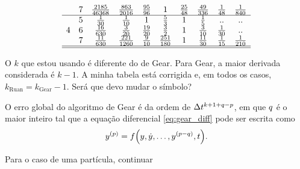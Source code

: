 \begin{table}[h]
\begin{equation*}
\begin{array}{cccccccccc}
		& 7 & \frac{2185}{46368} & \frac{863}{2016} & \frac{95}{96} & 1 & \frac{25}{48} & \frac{49}{336} & \frac{1}{48} & \frac{1}{840} \\
	\hline
		\multirow{3}{*}{4} 
		& 5 & \frac{1}{30} & \frac{1}{10} & 1 & \frac{5}{3} & 1 & \frac{1}{5} & .. & .. \\
		& 6 & \frac{16}{630} & \frac{3}{20} & \frac{19}{20} & \frac{3}{2} & 1 & \frac{3}{10} & \frac{1}{30} & .. \\
		& 7 & \frac{11}{630} & \frac{221}{1260} & \frac{9}{10} & \frac{251}{180} & 1 & \frac{11}{30} & \frac{1}{15} & \frac{1}{210} \\
	\hline
	\hline	
		\end{array}
	\end{equation*}
\end{table}

\alert{O \(k\) que estou usando é diferente do de Gear. Para Gear, a maior derivada considerada é \(k-1\). A minha tabela está corrigida e, em todos os casos, \(k_{\text{Ruan}} = k_{\text{Gear}}-1 \). Será que devo mudar o símbolo?}

O erro global do algoritmo de Gear é da ordem de \(\Delta t^{k+1+q-p}\), em que \(q\) é o maior inteiro tal que a equação diferencial \eqref{eq:gear_diff} pode ser escrita como
\[
	\deriv{\eqOrder}{y} = f\pqty{y, \deriv{1}{y},\dots,\deriv{\eqOrder-\maxDerivOrder}{y}, t}.
\]

Para o caso de uma partícula, \alert{continuar}